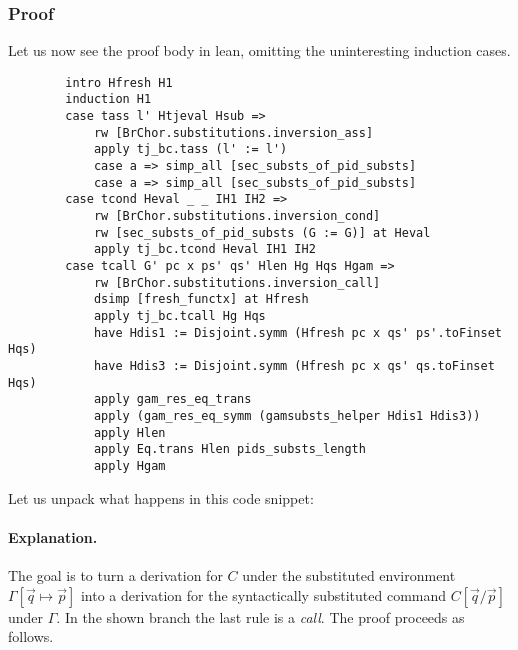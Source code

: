 \documentclass[12pt,a4paper,twoside]{book}
\begin{document}
\subsubsection{Proof}
Let us now see the proof body in lean, omitting the uninteresting induction cases.
\begin{samepage}
\begin{verbatim}
        intro Hfresh H1
        induction H1
        case tass l' Htjeval Hsub =>
            rw [BrChor.substitutions.inversion_ass]
            apply tj_bc.tass (l' := l')
            case a => simp_all [sec_substs_of_pid_substs]
            case a => simp_all [sec_substs_of_pid_substs]
        case tcond Heval _ _ IH1 IH2 =>
            rw [BrChor.substitutions.inversion_cond]
            rw [sec_substs_of_pid_substs (G := G)] at Heval
            apply tj_bc.tcond Heval IH1 IH2
        case tcall G' pc x ps' qs' Hlen Hg Hqs Hgam =>
            rw [BrChor.substitutions.inversion_call]
            dsimp [fresh_functx] at Hfresh
            apply tj_bc.tcall Hg Hqs
            have Hdis1 := Disjoint.symm (Hfresh pc x qs' ps'.toFinset Hqs)
            have Hdis3 := Disjoint.symm (Hfresh pc x qs' qs.toFinset Hqs)
            apply gam_res_eq_trans
            apply (gam_res_eq_symm (gamsubsts_helper Hdis1 Hdis3))
            apply Hlen
            apply Eq.trans Hlen pids_substs_length
            apply Hgam
\end{verbatim}
\end{samepage}
Let us unpack what happens in this code snippet:
\paragraph{Explanation.}
The goal is to turn a derivation for $C$ under the substituted environment $\Gamma[\vec{q}\mapsto\vec{p}]$ into a derivation for the syntactically substituted command $C[\vec{q}/\vec{p}]$ under $\Gamma$. In the shown branch the last rule is a \emph{call}. The proof proceeds as follows.
\end{document}

